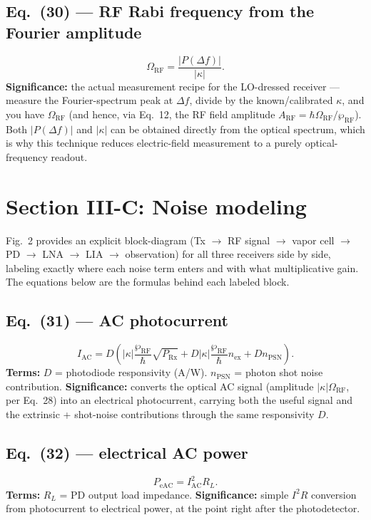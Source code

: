 \documentclass[11pt]{article}
\begin{document}
\subsection*{Eq.~(30) --- RF Rabi frequency from the Fourier amplitude}
\begin{equation}
\Omega_\text{RF} = \frac{|P(\Delta f)|}{|\kappa|}. \tag{30}
\end{equation}
\textbf{Significance:} the actual measurement recipe for the
LO-dressed receiver --- measure the Fourier-spectrum peak at $\Delta f$,
divide by the known/calibrated $\kappa$, and you have $\Omega_\text{RF}$
(and hence, via Eq.~12, the RF field amplitude $A_\text{RF}=\hbar\Omega_\text{RF}/\wp_\text{RF}$).
Both $|P(\Delta f)|$ and $|\kappa|$ can be obtained directly from the
optical spectrum, which is why this technique reduces electric-field
measurement to a purely optical-frequency readout.

\section{Section III-C: Noise modeling}

Fig.~2 provides an explicit block-diagram (Tx $\to$ RF signal $\to$
vapor cell $\to$ PD $\to$ LNA $\to$ LIA $\to$ observation) for all three
receivers side by side, labeling exactly where each noise term enters
and with what multiplicative gain. The equations below are the formulas
behind each labeled block.

\subsection*{Eq.~(31) --- AC photocurrent}
\begin{equation}
I_\text{AC} = D\left(|\kappa|\frac{\wp_\text{RF}}{\hbar}\sqrt{P_\text{Rx}}+D|\kappa|\frac{\wp_\text{RF}}{\hbar}n_\text{ex}+Dn_\text{PSN}\right). \tag{31}
\end{equation}
\textbf{Terms:} $D$ = photodiode responsivity (A/W). $n_\text{PSN}$ =
photon shot noise contribution.
\textbf{Significance:} converts the optical AC signal (amplitude
$|\kappa|\Omega_\text{RF}$, per Eq.~28) into an electrical photocurrent,
carrying both the useful signal and the extrinsic + shot-noise
contributions through the same responsivity $D$.

\subsection*{Eq.~(32) --- electrical AC power}
\begin{equation}
P_\text{eAC} = I_\text{AC}^2R_L. \tag{32}
\end{equation}
\textbf{Terms:} $R_L$ = PD output load impedance.
\textbf{Significance:} simple $I^2R$ conversion from photocurrent to
electrical power, at the point right after the photodetector.
\end{document}
